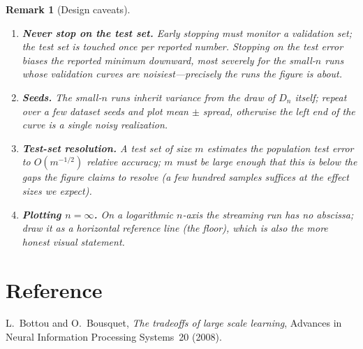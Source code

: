 \documentclass[11pt]{article}
\newtheorem{remark}{Remark}
\begin{document}
\begin{remark}[Design caveats]
\leavevmode
\begin{enumerate}
  \item \textbf{Never stop on the test set.} Early stopping must monitor a validation
  set; the test set is touched once per reported number. Stopping on the test error
  biases the reported minimum downward, most severely for the small-$n$ runs whose
  validation curves are noisiest---precisely the runs the figure is about.
  \item \textbf{Seeds.} The small-$n$ runs inherit variance from the draw of $D_n$
  itself; repeat over a few dataset seeds and plot mean $\pm$ spread, otherwise the
  left end of the curve is a single noisy realization.
  \item \textbf{Test-set resolution.} A test set of size $m$ estimates the population
  test error to $O(m^{-1/2})$ relative accuracy; $m$ must be large enough that this is
  below the gaps the figure claims to resolve (a few hundred samples suffices at the
  effect sizes we expect).
  \item \textbf{Plotting $n=\infty$.} On a logarithmic $n$-axis the streaming run has no
  abscissa; draw it as a horizontal reference line (the floor), which is also the more
  honest visual statement.
\end{enumerate}
\end{remark}

\section*{Reference}

L.~Bottou and O.~Bousquet, \emph{The tradeoffs of large scale learning}, Advances in
Neural Information Processing Systems~20 (2008).
\end{document}
